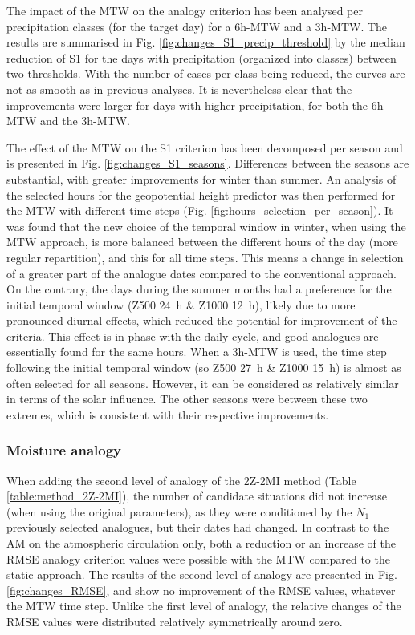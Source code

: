 \documentclass[hess, manuscript]{copernicus}
\begin{document}
	The impact of the MTW on the analogy criterion has been analysed per precipitation classes (for the target day) for a 6h-MTW and a 3h-MTW. The results are summarised in Fig. \ref{fig:changes_S1_precip_threshold} by the median reduction of S1 for the days with precipitation (organized into classes) between two thresholds. With the number of cases per class being reduced, the curves are not as smooth as in previous analyses. It is nevertheless clear that the improvements were larger for days with higher precipitation, for both the 6h-MTW and the 3h-MTW.
	
	The effect of the MTW on the S1 criterion has been decomposed per season and is presented in Fig. \ref{fig:changes_S1_seasons}. Differences between the seasons are substantial, with greater improvements for winter than summer. An analysis of the selected hours for the geopotential height predictor was then performed for the MTW with different time steps (Fig. \ref{fig:hours_selection_per_season}). It was found that the new choice of the temporal window in winter, when using the MTW approach, is more balanced between the different hours of the day (more regular repartition), and this for all time steps. This means a change in selection of a greater part of the analogue dates compared to the conventional approach. On the contrary, the days during the summer months had a preference for the initial temporal window (Z500 24~h \& Z1000 12~h), likely due to more pronounced diurnal effects, which reduced the potential for improvement of the criteria. This effect is in phase with the daily cycle, and good analogues are essentially found for the same hours. When a 3h-MTW is used, the time step following the initial temporal window (so Z500 27~h \& Z1000 15~h) is almost as often selected for all seasons. However, it can be considered as relatively similar in terms of the solar influence. The other seasons were between these two extremes, which is consistent with their respective improvements.
	
	
	\subsubsection{Moisture analogy}
	\label{sec:changes_analogy_moisture}
	
	When adding the second level of analogy of the 2Z-2MI method (Table \ref{table:method_2Z-2MI}), the number of candidate situations did not increase (when using the original parameters), as they were conditioned by the $N_{1}$ previously selected analogues, but their dates had changed. In contrast to the AM on the atmospheric circulation only, both a reduction or an increase of the RMSE analogy criterion values were possible with the MTW compared to the static approach. The results of the second level of analogy are presented in Fig. \ref{fig:changes_RMSE}, and show no improvement of the RMSE values, whatever the MTW time step. Unlike the first level of analogy, the relative changes of the RMSE values were distributed relatively symmetrically around zero.
	
\end{document}
